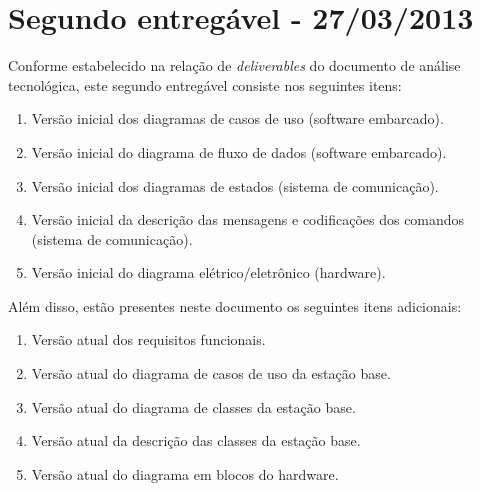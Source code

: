 \chapter{Segundo entregável - 27/03/2013}

Conforme estabelecido na relação de \textit{deliverables} do documento de análise tecnológica, este segundo entregável consiste nos seguintes itens:
\begin{enumerate}[topsep=0pt, partopsep=0pt, itemsep=0pt]
	\item Versão inicial dos diagramas de casos de uso (software embarcado).
	\item Versão inicial do diagrama de fluxo de dados (software embarcado).
	\item Versão inicial dos diagramas de estados (sistema de comunicação).
	\item Versão inicial da descrição das mensagens e codificações dos comandos (sistema de comunicação).
	\item Versão inicial do diagrama elétrico/eletrônico (hardware).
\end{enumerate}

\vspace{12pt}

Além disso, estão presentes neste documento os seguintes itens adicionais:
\begin{enumerate}
	\item Versão atual dos requisitos funcionais.
	\item Versão atual do diagrama de casos de uso da estação base.
	\item Versão atual do diagrama de classes da estação base.
	\item Versão atual da descrição das classes da estação base.
	\item Versão atual do diagrama em blocos do hardware.
\end{enumerate}